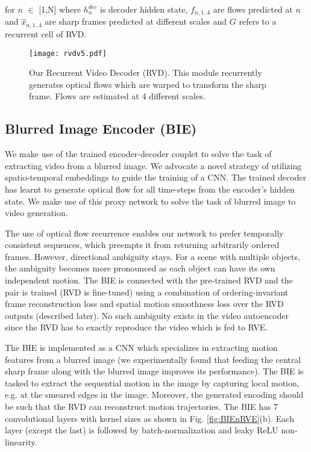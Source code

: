\documentclass[10pt,twocolumn,letterpaper]{article}
\begin{document}
\noindent for $n$ $\in$ [1,N] where $h^{dec}_n$ is decoder hidden state, $f_{n,1..4}$ are flows predicted at $n$ and $\hat{x}_{n,1..4}$ are sharp frames predicted at different scales and $G$ refers to a recurrent cell of RVD.

\begin{figure}
\begin{center}
   \texttt{[image: rvdv5.pdf]}
\end{center}
\vspace{-4mm}
   \caption{Our Recurrent Video Decoder (RVD). This module recurrently generates optical flows which are warped to transform the sharp frame. Flows are estimated at 4 different scales.}
\label{fig:RVD}
\end{figure}

\subsection{Blurred Image Encoder (BIE)}
\label{sec:bie}



We make use of the trained encoder-decoder couplet to solve the task of extracting video from a blurred image. 
We advocate a novel strategy of utilizing spatio-temporal embeddings to guide the training of a CNN. The trained decoder has learnt to generate optical flow for all time-steps from the encoder's hidden state. We make use of this proxy network to solve the task of blurred image to video generation.


The use of optical flow recurrence enables our network to prefer temporally consistent sequences, which preempts it from returning arbitrarily ordered frames. However, directional ambiguity stays.
For a scene with multiple objects, the ambiguity becomes more pronounced as each object can have its own independent motion. The BIE is connected with the pre-trained RVD and the pair is trained (RVD is fine-tuned) using a combination of ordering-invariant frame reconstruction loss and spatial motion smoothness loss over the RVD outputs (described later). No such ambiguity exists in the video autoencoder since the RVD has to exactly reproduce the video which is fed to RVE.


The BIE is implemented as a CNN which specializes in extracting motion features from a blurred image (we experimentally found that feeding the central sharp frame along with the blurred image improves its performance). The BIE is tasked to extract the sequential motion in the image by capturing local motion, e.g. at the smeared edges in the image. Moreover, the generated encoding should be such that the RVD can reconstruct motion trajectories. The BIE has 7 convolutional layers with kernel sizes as shown in Fig. \ref{fig:BIEnRVE}(b). Each layer (except the last) is followed by batch-normalization and leaky ReLU non-linearity.
\end{document}
